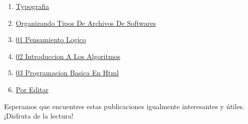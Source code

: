 \documentclass[
  jou,
  floatsintext,
  longtable,
  a4paper,
  nolmodern,
  notxfonts,
  notimes,
  colorlinks=true,linkcolor=blue,citecolor=blue,urlcolor=blue]{apa7}
\providecommand{\tightlist}{%
  \setlength{\itemsep}{0pt}\setlength{\parskip}{0pt}}
\begin{document}
\begin{enumerate}
\def\labelenumi{\arabic{enumi}.}
\tightlist
\item
  \href{https://achalmaedison.netlify.app/programacion-software/fundamentos-programacion/2018-06-09-typografia/index.pdf}{}
  \href{https://achalmaedison.netlify.app/programacion-software/fundamentos-programacion/2018-06-09-typografia}{Typografia}
\item
  \href{https://achalmaedison.netlify.app/programacion-software/fundamentos-programacion/2019-08-13-organizando-tipos-de-archivos-de-softwares/index.pdf}{}
  \href{https://achalmaedison.netlify.app/programacion-software/fundamentos-programacion/2019-08-13-organizando-tipos-de-archivos-de-softwares}{Organizando
  Tipos De Archivos De Softwares}
\item
  \href{https://achalmaedison.netlify.app/programacion-software/fundamentos-programacion/2021-01-04-01-pensamiento-logico/index.pdf}{}
  \href{https://achalmaedison.netlify.app/programacion-software/fundamentos-programacion/2021-01-04-01-pensamiento-logico}{01
  Pensamiento Logico}
\item
  \href{https://achalmaedison.netlify.app/programacion-software/fundamentos-programacion/2021-01-11-02-introduccion-a-los-algoritmos/index.pdf}{}
  \href{https://achalmaedison.netlify.app/programacion-software/fundamentos-programacion/2021-01-11-02-introduccion-a-los-algoritmos}{02
  Introduccion A Los Algoritmos}
\item
  \href{https://achalmaedison.netlify.app/programacion-software/fundamentos-programacion/2021-01-18-03-programacion-basica-en-html/index.pdf}{}
  \href{https://achalmaedison.netlify.app/programacion-software/fundamentos-programacion/2021-01-18-03-programacion-basica-en-html}{03
  Programacion Basica En Html}
\item
  \href{https://achalmaedison.netlify.app/programacion-software/fundamentos-programacion/2024-03-31-por-editar/index.pdf}{}
  \href{https://achalmaedison.netlify.app/programacion-software/fundamentos-programacion/2024-03-31-por-editar}{Por
  Editar}
\end{enumerate}

Esperamos que encuentres estas publicaciones igualmente interesantes y
útiles. ¡Disfruta de la lectura!
\end{document}
